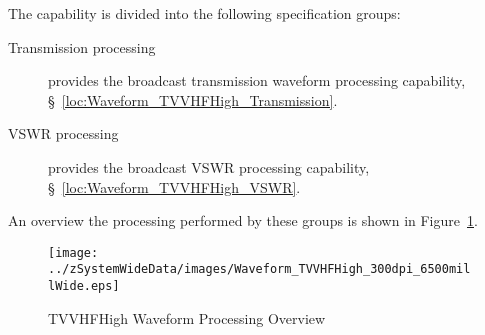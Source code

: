 The \ThisSys \ThisSegment \TVVHFHigh capability is divided into the following specification groups:
\begin{description}
	\item[Transmission processing] provides the \TVVHFHigh broadcast transmission waveform processing capability, \S~\ref{loc:Waveform_TVVHFHigh_Transmission}.
	\item[VSWR processing]  provides the \TVVHFHigh broadcast VSWR processing capability, \S~\ref{loc:Waveform_TVVHFHigh_VSWR}.
\end{description}
An overview the processing performed by these groups is shown in Figure~\ref{fig:TVVHFHigh_Waveform_Processing}.
\begin{figure}[htbp]
	\centering
		\texttt{[image: ../zSystemWideData/images/Waveform\_TVVHFHigh\_300dpi\_6500millWide.eps]}
	\caption[TVVHFHigh Waveform Processing Overview]{TVVHFHigh Waveform Processing Overview}
	\label{fig:TVVHFHigh_Waveform_Processing}
\end{figure}

%
%
%


